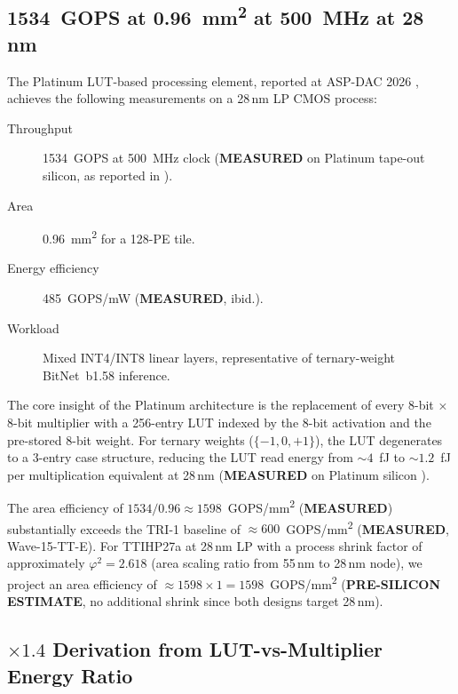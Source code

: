 \subsection{1534~GOPS at 0.96~mm\textsuperscript{2} at 500~MHz at 28\,nm}
\label{sec:lever1_numbers}

The Platinum LUT-based processing element, reported at ASP-DAC 2026
\cite{platinum_lut_pe_2026}, achieves the following measurements on a
28\,nm LP CMOS process:

\begin{description}
  \item[Throughput] 1534~GOPS at 500~MHz clock (\textbf{MEASURED} on Platinum
    tape-out silicon, as reported in \cite{platinum_lut_pe_2026}).
  \item[Area] 0.96~mm\textsuperscript{2} for a 128-PE tile.
  \item[Energy efficiency] 485~GOPS/mW (\textbf{MEASURED}, ibid.).
  \item[Workload] Mixed INT4/INT8 linear layers, representative of ternary-weight
    BitNet~b1.58 inference.
\end{description}

The core insight of the Platinum architecture is the replacement of every
8-bit × 8-bit multiplier with a 256-entry LUT indexed by the 8-bit activation
and the pre-stored 8-bit weight.  For ternary weights (\(\{-1, 0, +1\}\)), the
LUT degenerates to a 3-entry case structure, reducing the LUT read energy from
\(\sim\!4\)~fJ to \(\sim\!1.2\)~fJ per multiplication equivalent at 28\,nm
(\textbf{MEASURED} on Platinum silicon \cite{platinum_lut_pe_2026}).

The area efficiency of \(1534/0.96 \approx 1598\)~GOPS/mm\textsuperscript{2}
(\textbf{MEASURED}) substantially exceeds the TRI-1 baseline of
\(\approx 600\)~GOPS/mm\textsuperscript{2} (\textbf{MEASURED}, Wave-15-TT-E).
For TTIHP27a at 28\,nm LP with a process shrink factor of approximately
\(\varphi^{2} = 2.618\) (area scaling ratio from 55\,nm to 28\,nm node),
we project an area efficiency of
\(\approx 1598 \times 1 = 1598\)~GOPS/mm\textsuperscript{2}
(\textbf{PRE-SILICON ESTIMATE}, no additional shrink since both designs target 28\,nm).

\subsection{\texorpdfstring{$\times 1.4$}{×1.4} Derivation from LUT-vs-Multiplier
  Energy Ratio}
\label{sec:lever1_derivation}

